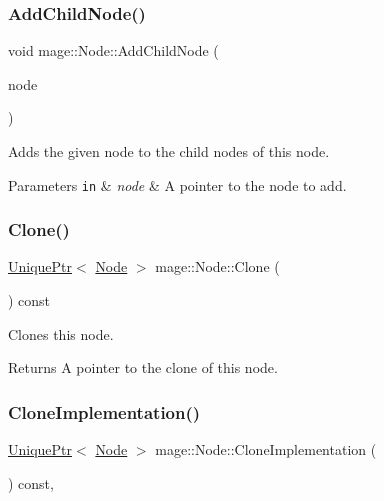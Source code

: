 \subsubsection{\texorpdfstring{Add\+Child\+Node()}{AddChildNode()}}
{\footnotesize\ttfamily void mage\+::\+Node\+::\+Add\+Child\+Node (\begin{DoxyParamCaption}\item[{\hyperlink{namespacemage_a1e01ae66713838a7a67d30e44c67703e}{Shared\+Ptr}$<$ \hyperlink{classmage_1_1_node}{Node} $>$}]{node }\end{DoxyParamCaption})}

Adds the given node to the child nodes of this node.


\begin{DoxyParams}[1]{Parameters}
\mbox{\tt in}  & {\em node} & A pointer to the node to add. \\
\hline
\end{DoxyParams}
\hypertarget{classmage_1_1_node_a18e08151571435d319be2414474c93c0}{}\label{classmage_1_1_node_a18e08151571435d319be2414474c93c0} 
\subsubsection{\texorpdfstring{Clone()}{Clone()}}
{\footnotesize\ttfamily \hyperlink{namespacemage_a8c307fbcc33bce9b7f2aa4c26c3b95cf}{Unique\+Ptr}$<$ \hyperlink{classmage_1_1_node}{Node} $>$ mage\+::\+Node\+::\+Clone (\begin{DoxyParamCaption}{ }\end{DoxyParamCaption}) const}

Clones this node.

\begin{DoxyReturn}{Returns}
A pointer to the clone of this node. 
\end{DoxyReturn}
\hypertarget{classmage_1_1_node_a71a4763bfd4cba5653488b490e61dc8f}{}\label{classmage_1_1_node_a71a4763bfd4cba5653488b490e61dc8f} 
\subsubsection{\texorpdfstring{Clone\+Implementation()}{CloneImplementation()}}
{\footnotesize\ttfamily \hyperlink{namespacemage_a8c307fbcc33bce9b7f2aa4c26c3b95cf}{Unique\+Ptr}$<$ \hyperlink{classmage_1_1_node}{Node} $>$ mage\+::\+Node\+::\+Clone\+Implementation (\begin{DoxyParamCaption}{ }\end{DoxyParamCaption}) const\hspace{0.3cm}{\ttfamily [private]}, {\ttfamily [virtual]}}

